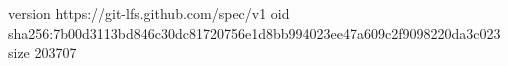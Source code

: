 version https://git-lfs.github.com/spec/v1
oid sha256:7b00d3113bd846c30dc81720756e1d8bb994023ee47a609c2f9098220da3c023
size 203707
